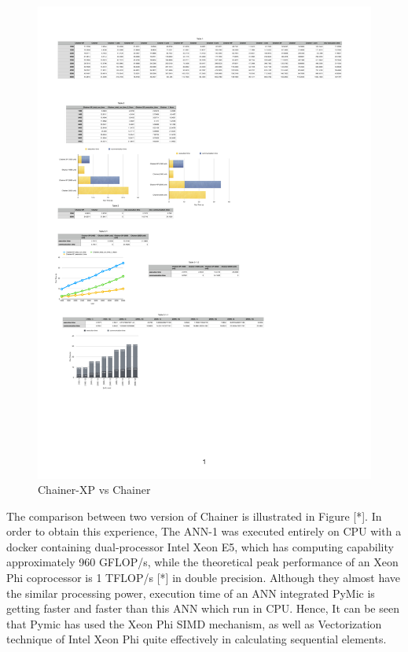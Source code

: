 \begin{figure}[]
\centering
\includegraphics[scale=0.6]{img/c.pdf}
\caption{Chainer-XP vs Chainer}
\end{figure}

The comparison between two version of Chainer is illustrated in Figure [*]. In order to obtain this experience, The ANN-1 was executed entirely on CPU with a docker containing dual-processor Intel Xeon E5, which has computing capability approximately 960 GFLOP/s, while the theoretical peak performance of an Xeon Phi coprocessor is 1 TFLOP/s [*] in double precision. Although they almost have the similar processing power, execution time of an ANN integrated PyMic  is getting faster and faster than this ANN which run in CPU. Hence, It can be seen that Pymic has used the Xeon Phi SIMD mechanism, as well as Vectorization technique of Intel Xeon Phi quite effectively in calculating sequential elements.
